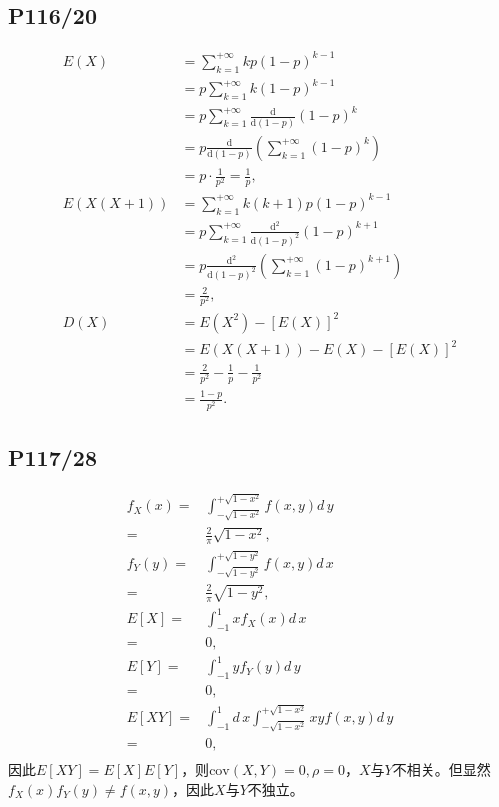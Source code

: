 \documentclass[UTF8,a4paper,10pt]{ctexart}
\def\deriv{d\,}
\begin{document}
\subsection{P116/20}
\begin{align}
    E(X) &= \sum_{k = 1}^{+\infty}kp(1-p)^{k-1} \nonumber \\
         &= p\sum_{k = 1}^{+\infty}k(1-p)^{k-1} \nonumber \\
         &= p\sum_{k = 1}^{+\infty}\frac{\text{d}}{\text{d} (1 - p)}(1 - p)^k \nonumber \\
         &= p\frac{\text{d}}{\text{d} (1 - p)}\left(\sum_{k = 1}^{+\infty}(1 - p)^k\right) \nonumber \\
         &= p\cdot\frac{1}{p^2} = \frac{1}{p},\\
    E(X(X + 1)) &= \sum_{k = 1}^{+\infty}k(k + 1)p(1-p)^{k-1} \nonumber \\
                &= p\sum_{k = 1}^{+\infty}\frac{\text{d}^2}{\text{d} (1 - p)^2}(1 - p)^{k+1} \nonumber \\
                &= p\frac{\text{d}^2}{\text{d} (1 - p)^2}\left(\sum_{k = 1}^{+\infty}(1 - p)^{k+1}\right) \nonumber \\
                &= \frac{2}{p^2}, \\
    D(X) &= E(X^2) - [E(X)]^2 \nonumber \\
         &= E(X(X + 1)) - E(X) - [E(X)]^2 \nonumber \\
         &= \frac{2}{p^2} - \frac{1}{p} - \frac{1}{p^2} \nonumber \\
         &= \frac{1 - p}{p^2}.
\end{align}




\subsection{P117/28}
\begin{align}
    f_X(x) =& \int_{-\sqrt{1 - x^2}}^{+\sqrt{1 - x^2}}f(x, y)\deriv y \nonumber \\
           =& \frac{2}{\pi}\sqrt{1 - x^2}, \\
    f_Y(y) =& \int_{-\sqrt{1 - y^2}}^{+\sqrt{1 - y^2}}f(x, y)\deriv x \nonumber \\
           =& \frac{2}{\pi}\sqrt{1 - y^2}, \\
    E[X] =& \int_{-1}^{1}xf_X(x)\deriv x \nonumber \\
         =& 0, \\
    E[Y] =& \int_{-1}^{1}yf_Y(y)\deriv y \nonumber \\
         =& 0,\\
    E[XY] =& \int_{-1}^{1}\deriv x\int_{-\sqrt{1 - x^2}}^{+\sqrt{1 - x^2}}xyf(x, y)\deriv y \nonumber \\
          =& 0,\\
\end{align}
因此$E[XY] = E[X]E[Y]$，则$\mathrm{cov}(X,Y) = 0, \rho = 0$，$X$与$Y$不相关。但显然$f_X(x)f_Y(y) \not= f(x,y)$，因此$X$与$Y$不独立。
\end{document}
